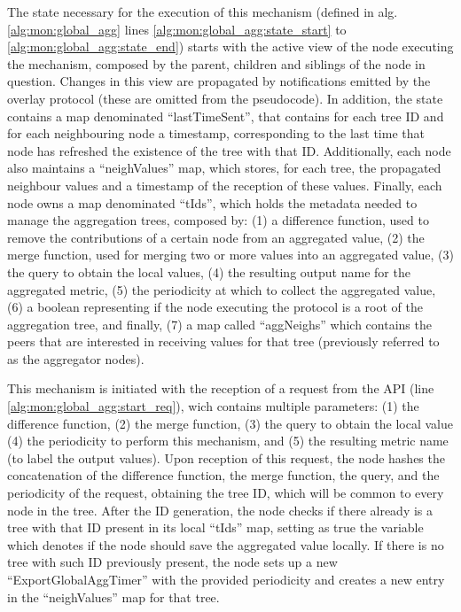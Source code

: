 

The state necessary for the execution of this mechanism (defined in alg. \ref{alg:mon:global_agg} lines \ref{alg:mon:global_agg:state_start} to \ref{alg:mon:global_agg:state_end}) starts with the active view of the node executing the mechanism, composed by the parent, children and siblings of the node in question. Changes in this view are propagated by notifications emitted by the overlay protocol (these are omitted from the pseudocode). In addition, the state contains a map denominated ``lastTimeSent'', that contains for each tree ID and for each neighbouring node a timestamp, corresponding to the last time that node has refreshed the existence of the tree with that ID. Additionally, each node also maintains a ``neighValues'' map, which stores, for each tree, the propagated neighbour values and a timestamp of the reception of these values. Finally, each node owns a map denominated ``tIds'',  which holds the metadata needed to manage the aggregation trees, composed by: (1) a difference function, used to remove the contributions of a certain node from an aggregated value, (2) the merge function, used for merging two or more values into an aggregated value, (3) the query to obtain the local values, (4) the resulting output name for the aggregated metric, (5) the periodicity at which to collect the aggregated value, (6) a boolean representing if the node executing the protocol is a root of the aggregation tree, and finally, (7) a map called ``aggNeighs'' which contains the peers that are interested in receiving values for that tree (previously referred to as the aggregator nodes).

This mechanism is initiated with the reception of a request from the API (line \ref{alg:mon:global_agg:start_req}), wich contains multiple parameters: (1) the difference function, (2) the merge function, (3) the query to obtain the local value (4) the periodicity to perform this mechanism, and (5) the resulting metric name (to label the output values). Upon reception of this request, the node hashes the concatenation of the difference function, the merge function, the query, and the periodicity of the request, obtaining the tree ID, which will be common to every node in the tree. After the ID generation, the node checks if there already is a tree with that ID present in its local ``tIds'' map, setting as true the variable which denotes if the node should save the aggregated value locally. If there is no tree with such ID previously present, the node sets up a new ``ExportGlobalAggTimer'' with the provided periodicity and creates a new entry in the ``neighValues'' map for that tree.

